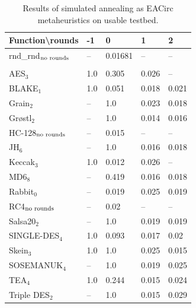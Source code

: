 \documentclass[
    digital,    %
    oneside,    %
    color,
    11pt,
    nocover,
    notable,
    nolof,
    nolot,
]{fithesis3}
\newcommand{\fd}{\cellcolor{red!25}}
\newcommand{\fn}{}
\begin{document}
\begin{table}[H]
\centering
\begin{tabular}{l|l l l l}
\textbf{\large Function\textbackslash{}rounds} & \textbf{\large -1} & \textbf{\large 0} & \textbf{\large 1} & \textbf{\large 2}\\ \hline
rnd\_rnd$_{\textnormal{no rounds}}$ & -- & \fn{}0.01681& -- & --    \\\\
AES$_{3}$        & \fd{}1.0   & \fd{}0.305 & \fn{}0.026 & \fn{}--   \\
BLAKE$_{1}$      & \fd{}1.0   & \fd{}0.051 & \fn{}0.018 & \fn{}0.021\\
Grain$_{2}$      & \fd{}--    & \fd{}1.0   & \fn{}0.023 & \fn{}0.018\\
Gr\o stl$_{2}$   & \fd{}--    & \fd{}1.0   & \fn{}0.014 & \fn{}0.016\\
HC-128$_{\textnormal{no rounds}}$& -- & \fn{}0.015 & -- & --        \\
JH$_{6}$         & \fd{}--    & \fd{}1.0   & \fn{}0.016 & \fn{}0.018\\
Keccak$_{3}$     & \fd{}1.0   & \fn{}0.012 & \fn{}0.026 & \fn{}--   \\
MD6$_{8}$        & \fd{}--    & \fd{}0.419 & \fn{}0.016 & \fn{}0.018\\
Rabbit$_{0}$     &      --    & \fn{}0.019 & \fn{}0.025 & \fn{}0.019\\
RC4$_{\textnormal{no rounds}}$& -- & \fn{}0.02  & --    & --        \\
Salsa20$_{2}$    & \fd{}--    & \fd{}1.0   & \fn{}0.019 & \fn{}0.019\\
SINGLE-DES$_{4}$ & \fd{}1.0   & \fd{}0.093 & \fn{}0.017 & \fn{}0.02 \\
Skein$_{3}$      & \fd{}1.0   & \fd{}1.0   & \fn{}0.025 & \fn{}0.015\\
SOSEMANUK$_{4}$  & \fd{}--    & \fd{}1.0   & \fn{}0.019 & \fn{}0.025\\
TEA$_{4}$        & \fd{}1.0   & \fd{}0.244 & \fn{}0.015 & \fn{}0.024\\
Triple DES$_{2}$ & \fd{}--    & \fd{}1.0   & \fn{}0.015 & \fn{}0.029
\end{tabular}
\caption{Results of simulated annealing as EACirc metaheuristics on usable testbed.}
\label{table:res-usable-sa}
\end{table}
\end{document}
